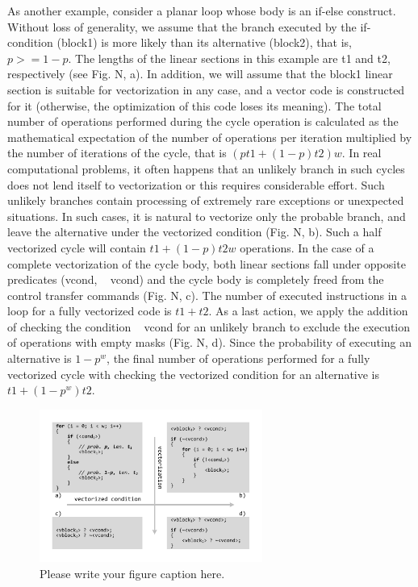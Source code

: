 \documentclass[
11pt,%
tightenlines,%
twoside,%
onecolumn,%
nofloats,%
nobibnotes,%
nofootinbib,%
superscriptaddress,%
noshowpacs,%
centertags]%
{revtex4}
\begin{document}
As another example, consider a planar loop whose body is an if-else construct. Without loss of generality, we assume that the branch executed by the if-condition (block1) is more likely than its alternative (block2), that is, $p> = 1 - p$. The lengths of the linear sections in this example are t1 and t2, respectively (see Fig. N, a). In addition, we will assume that the block1 linear section is suitable for vectorization in any case, and a vector code is constructed for it (otherwise, the optimization of this code loses its meaning). The total number of operations performed during the cycle operation is calculated as the mathematical expectation of the number of operations per iteration multiplied by the number of iterations of the cycle, that is $(pt1 + (1 - p) t2) w$. In real computational problems, it often happens that an unlikely branch in such cycles does not lend itself to vectorization or this requires considerable effort. Such unlikely branches contain processing of extremely rare exceptions or unexpected situations. In such cases, it is natural to vectorize only the probable branch, and leave the alternative under the vectorized condition (Fig. N, b). Such a half vectorized cycle will contain $t1 + (1 - p) t2w$ operations. In the case of a complete vectorization of the cycle body, both linear sections fall under opposite predicates (vcond, ~ vcond) and the cycle body is completely freed from the control transfer commands (Fig. N, c). The number of executed instructions in a loop for a fully vectorized code is $t1 + t2$. As a last action, we apply the addition of checking the condition ~ vcond for an unlikely branch to exclude the execution of operations with empty masks (Fig. N, d). Since the probability of executing an alternative is $1 - p ^ w$, the final number of operations performed for a fully vectorized cycle with checking the vectorized condition for an alternative is $t1 + (1 - p ^ w) t2$.

\begin{figure}[h]
\setcaptionmargin{5mm}
\onelinecaptionstrue  %
\includegraphics[width=0.65\textwidth]{pics/if_else_vectorization.pdf}
\caption{Please write your figure caption here.}\label{fig:1}
\end{figure}
\end{document}
